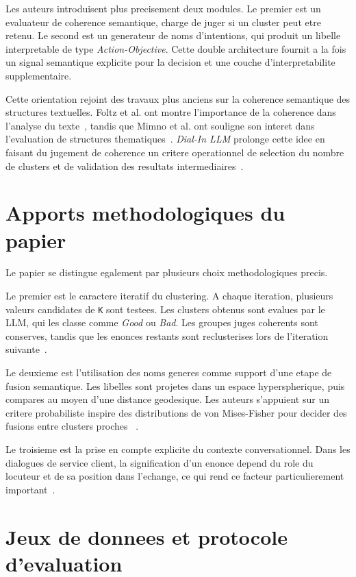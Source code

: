 Les auteurs introduisent plus precisement deux modules. Le premier est un
evaluateur de coherence semantique, charge de juger si un cluster peut etre
retenu. Le second est un generateur de noms d'intentions, qui produit un
libelle interpretable de type \emph{Action-Objective}. Cette double
architecture fournit a la fois un signal semantique explicite pour la decision
et une couche d'interpretabilite supplementaire.

Cette orientation rejoint des travaux plus anciens sur la coherence semantique
des structures textuelles. Foltz et al. ont montre l'importance de la
coherence dans l'analyse du texte~\cite{foltz1998measurement}, tandis que
Mimno et al. ont souligne son interet dans l'evaluation de structures
thematiques~\cite{mimno2011optimizing}. \emph{Dial-In LLM} prolonge cette idee
en faisant du jugement de coherence un critere operationnel de selection du
nombre de clusters et de validation des resultats
intermediaires~\cite{hong2025dialinllm}.

\section{Apports methodologiques du papier}

Le papier se distingue egalement par plusieurs choix methodologiques precis.

Le premier est le caractere iteratif du clustering. A chaque iteration,
plusieurs valeurs candidates de \texttt{K} sont testees. Les clusters obtenus
sont evalues par le LLM, qui les classe comme \emph{Good} ou \emph{Bad}. Les
groupes juges coherents sont conserves, tandis que les enonces restants sont
reclusterises lors de l'iteration suivante~\cite{hong2025dialinllm}.

Le deuxieme est l'utilisation des noms generes comme support d'une etape de
fusion semantique. Les libelles sont projetes dans un espace hyperspherique,
puis compares au moyen d'une distance geodesique. Les auteurs s'appuient sur
un critere probabiliste inspire des distributions de von Mises-Fisher pour
decider des fusions entre clusters proches
~\cite{fletcher2004principal,banerjee2005clustering,hong2025dialinllm}.

Le troisieme est la prise en compte explicite du contexte conversationnel. Dans
les dialogues de service client, la signification d'un enonce depend du role du
locuteur et de sa position dans l'echange, ce qui rend ce facteur
particulierement important~\cite{hong2025dialinllm}.

\section{Jeux de donnees et protocole d'evaluation}

